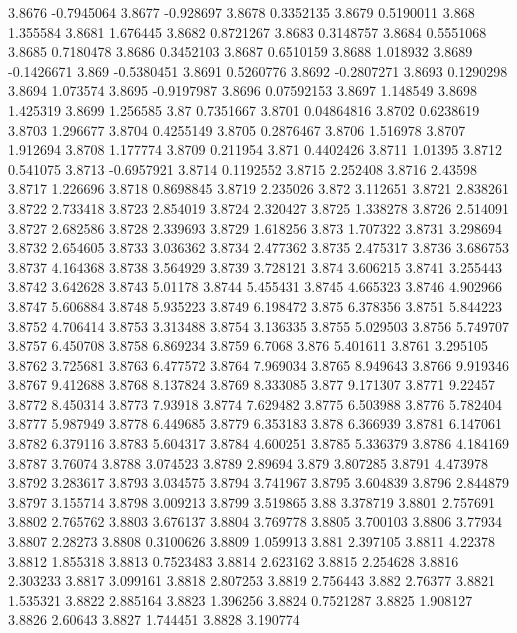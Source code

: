 3.8676  -0.7945064
3.8677  -0.928697
3.8678  0.3352135
3.8679  0.5190011
3.868  1.355584
3.8681  1.676445
3.8682  0.8721267
3.8683  0.3148757
3.8684  0.5551068
3.8685  0.7180478
3.8686  0.3452103
3.8687  0.6510159
3.8688  1.018932
3.8689  -0.1426671
3.869  -0.5380451
3.8691  0.5260776
3.8692  -0.2807271
3.8693  0.1290298
3.8694  1.073574
3.8695  -0.9197987
3.8696  0.07592153
3.8697  1.148549
3.8698  1.425319
3.8699  1.256585
3.87  0.7351667
3.8701  0.04864816
3.8702  0.6238619
3.8703  1.296677
3.8704  0.4255149
3.8705  0.2876467
3.8706  1.516978
3.8707  1.912694
3.8708  1.177774
3.8709  0.211954
3.871  0.4402426
3.8711  1.01395
3.8712  0.541075
3.8713  -0.6957921
3.8714  0.1192552
3.8715  2.252408
3.8716  2.43598
3.8717  1.226696
3.8718  0.8698845
3.8719  2.235026
3.872  3.112651
3.8721  2.838261
3.8722  2.733418
3.8723  2.854019
3.8724  2.320427
3.8725  1.338278
3.8726  2.514091
3.8727  2.682586
3.8728  2.339693
3.8729  1.618256
3.873  1.707322
3.8731  3.298694
3.8732  2.654605
3.8733  3.036362
3.8734  2.477362
3.8735  2.475317
3.8736  3.686753
3.8737  4.164368
3.8738  3.564929
3.8739  3.728121
3.874  3.606215
3.8741  3.255443
3.8742  3.642628
3.8743  5.01178
3.8744  5.455431
3.8745  4.665323
3.8746  4.902966
3.8747  5.606884
3.8748  5.935223
3.8749  6.198472
3.875  6.378356
3.8751  5.844223
3.8752  4.706414
3.8753  3.313488
3.8754  3.136335
3.8755  5.029503
3.8756  5.749707
3.8757  6.450708
3.8758  6.869234
3.8759  6.7068
3.876  5.401611
3.8761  3.295105
3.8762  3.725681
3.8763  6.477572
3.8764  7.969034
3.8765  8.949643
3.8766  9.919346
3.8767  9.412688
3.8768  8.137824
3.8769  8.333085
3.877  9.171307
3.8771  9.22457
3.8772  8.450314
3.8773  7.93918
3.8774  7.629482
3.8775  6.503988
3.8776  5.782404
3.8777  5.987949
3.8778  6.449685
3.8779  6.353183
3.878  6.366939
3.8781  6.147061
3.8782  6.379116
3.8783  5.604317
3.8784  4.600251
3.8785  5.336379
3.8786  4.184169
3.8787  3.76074
3.8788  3.074523
3.8789  2.89694
3.879  3.807285
3.8791  4.473978
3.8792  3.283617
3.8793  3.034575
3.8794  3.741967
3.8795  3.604839
3.8796  2.844879
3.8797  3.155714
3.8798  3.009213
3.8799  3.519865
3.88  3.378719
3.8801  2.757691
3.8802  2.765762
3.8803  3.676137
3.8804  3.769778
3.8805  3.700103
3.8806  3.77934
3.8807  2.28273
3.8808  0.3100626
3.8809  1.059913
3.881  2.397105
3.8811  4.22378
3.8812  1.855318
3.8813  0.7523483
3.8814  2.623162
3.8815  2.254628
3.8816  2.303233
3.8817  3.099161
3.8818  2.807253
3.8819  2.756443
3.882  2.76377
3.8821  1.535321
3.8822  2.885164
3.8823  1.396256
3.8824  0.7521287
3.8825  1.908127
3.8826  2.60643
3.8827  1.744451
3.8828  3.190774
